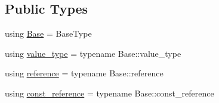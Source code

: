 \subsection*{Public Types}
{\bf }\par
\begin{DoxyCompactItemize}
\item 
using \hyperlink{structcnt_1_1help_1_1Accessor_a6728450f8fdeca32e8ed372b41b3467b}{Base} = Base\+Type
\item 
using \hyperlink{structcnt_1_1help_1_1Accessor_ad8a10e7f904fd874307b32b298aa1d54}{value\+\_\+type} = typename Base\+::value\+\_\+type
\item 
using \hyperlink{structcnt_1_1help_1_1Accessor_a75659462be135d55bf8f4d6409b84a1f}{reference} = typename Base\+::reference
\item 
using \hyperlink{structcnt_1_1help_1_1Accessor_a8575d9de6bcb21a1bd6935d500cfcb89}{const\+\_\+reference} = typename Base\+::const\+\_\+reference
\end{DoxyCompactItemize}

